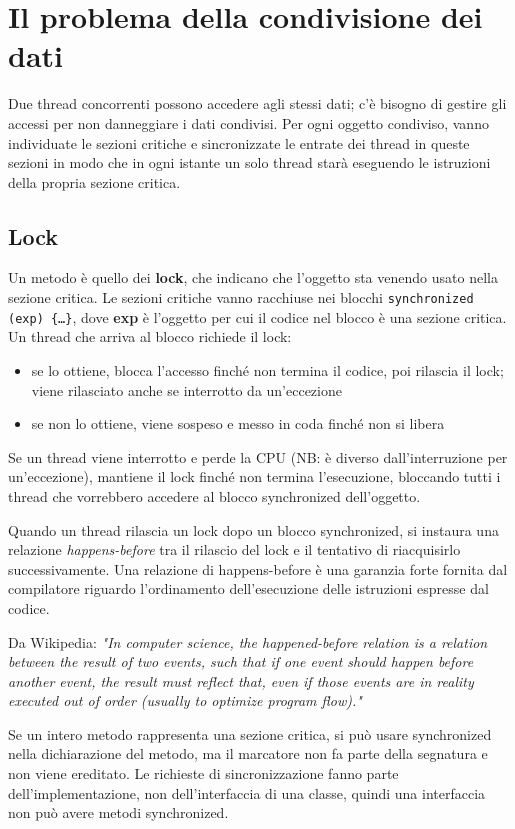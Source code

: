 \section{Il problema della condivisione dei dati}
Due thread concorrenti possono accedere agli stessi dati; c'è bisogno di gestire gli accessi per non danneggiare i dati condivisi. Per ogni oggetto condiviso, vanno individuate le sezioni critiche e sincronizzate le entrate dei thread in queste sezioni in modo che in ogni istante un solo thread starà eseguendo le istruzioni della propria sezione critica.

\subsection{Lock}
Un metodo è quello dei \textbf{lock}, che indicano che l'oggetto sta venendo usato nella sezione critica.
Le sezioni critiche vanno racchiuse nei blocchi \texttt{synchronized (exp) \{…\}}, dove \textbf{exp} è l'oggetto per cui il codice nel blocco è una sezione critica.
Un thread che arriva al blocco richiede il lock:
\begin{itemize}
\item se lo ottiene, blocca l'accesso finché non termina il codice, poi rilascia il lock; viene rilasciato anche se interrotto da un'eccezione
\item se non lo ottiene, viene sospeso e messo in coda finché non si libera
\end{itemize}
Se un thread viene interrotto e perde la CPU (NB: è diverso dall'interruzione per un'eccezione), mantiene il lock finché non termina l'esecuzione, bloccando tutti i thread che vorrebbero accedere al blocco synchronized dell'oggetto.

Quando un thread rilascia un lock dopo un blocco synchronized, si instaura una relazione \textit{happens-before} tra il rilascio del lock e il tentativo di riacquisirlo successivamente. Una relazione di happens-before \`e una garanzia forte fornita dal compilatore riguardo l'ordinamento dell'esecuzione delle istruzioni espresse dal codice.

Da Wikipedia: \textit{"In computer science, the happened-before relation is a relation between the result of two events, such that if one event should happen before another event, the result must reflect that, even if those events are in reality executed out of order (usually to optimize program flow)."}

Se un intero metodo rappresenta una sezione critica, si può usare synchronized nella dichiarazione del metodo, ma il marcatore non fa parte della segnatura e non viene ereditato. Le richieste di sincronizzazione fanno parte dell'implementazione, non dell'interfaccia di una classe, quindi una interfaccia non può avere metodi synchronized.

